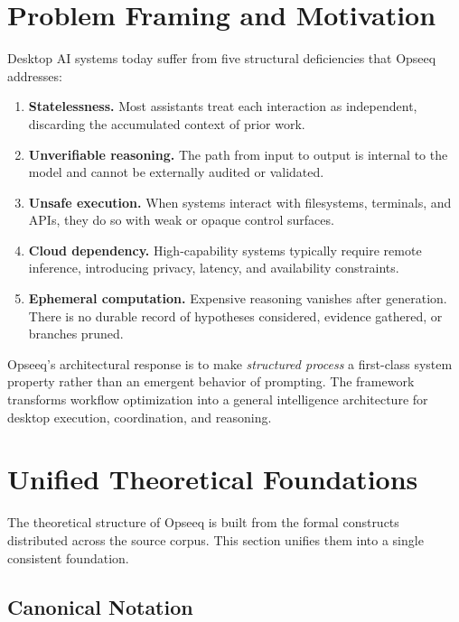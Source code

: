 \documentclass[11pt]{article}
\theoremstyle{remark}
\begin{document}
\section{Problem Framing and Motivation}
\label{sec:motivation}

Desktop AI systems today suffer from five structural deficiencies that Opseeq addresses:

\begin{enumerate}
  \item \textbf{Statelessness.} Most assistants treat each interaction as independent, discarding the accumulated context of prior work.
  \item \textbf{Unverifiable reasoning.} The path from input to output is internal to the model and cannot be externally audited or validated.
  \item \textbf{Unsafe execution.} When systems interact with filesystems, terminals, and APIs, they do so with weak or opaque control surfaces.
  \item \textbf{Cloud dependency.} High-capability systems typically require remote inference, introducing privacy, latency, and availability constraints.
  \item \textbf{Ephemeral computation.} Expensive reasoning vanishes after generation. There is no durable record of hypotheses considered, evidence gathered, or branches pruned.
\end{enumerate}

Opseeq's architectural response is to make \emph{structured process} a first-class system property rather than an emergent behavior of prompting. The framework transforms workflow optimization into a general intelligence architecture for desktop execution, coordination, and reasoning.

\section{Unified Theoretical Foundations}
\label{sec:theory}

The theoretical structure of Opseeq is built from the formal constructs distributed across the source corpus. This section unifies them into a single consistent foundation.

\subsection{Canonical Notation}
\label{subsec:notation}
\end{document}
